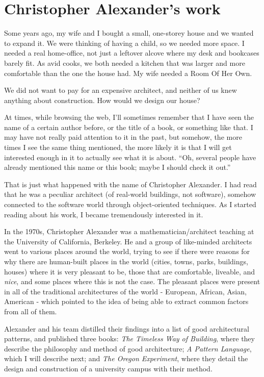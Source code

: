 \section*{Christopher Alexander's work}

Some years ago, my wife and I bought a small, one-storey house and we wanted to expand it. We were thinking of having a child, so we needed more space. I needed a real home-office, not just a leftover alcove where my desk and bookcases barely fit. As avid cooks, we both needed a kitchen that was larger and more comfortable than the one the house had. My wife needed a Room Of Her Own.

We did not want to pay for an expensive architect, and neither of us knew anything about construction.  How would we design our house?

At times, while browsing the web, I'll sometimes remember that I have seen the name of a certain author before, or the title of a book, or something like that. I may have not really paid attention to it in the past, but somehow, the more times I see the same thing mentioned, the more likely it is that I will get interested enough in it to actually see what it is about. ``Oh, several people have already mentioned this name or this book; maybe I should check it out.''

That is just what happened with the name of Christopher Alexander. I had read that he was a peculiar architect (of real-world buildings, not software), somehow connected to the software world through object-oriented techniques. As I started reading about his work, I became tremendously interested in it.

In the 1970s, Christopher Alexander was a mathematician/architect teaching at the University of California, Berkeley. He and a group of like-minded architects went to various places around the world, trying to see if there were reasons for why there are human-built places in the world (cities, towns, parks, buildings, houses) where it is very pleasant to be, those that are comfortable, liveable, and \textit{nice}, and some places where this is not the case. The pleasant places were present in all of the traditional architectures of the world - European, African, Asian, American - which pointed to the idea of being able to extract common factors from all of them.

Alexander and his team distilled their findings into a list of good architectural patterns, and published three books: \textit{The Timeless Way of Building}, where they describe the philosophy and method of good architecture; \textit{A Pattern Language}, which I will describe next; and \textit{The Oregon Experiment}, where they detail the design and construction of a university campus with their method.

